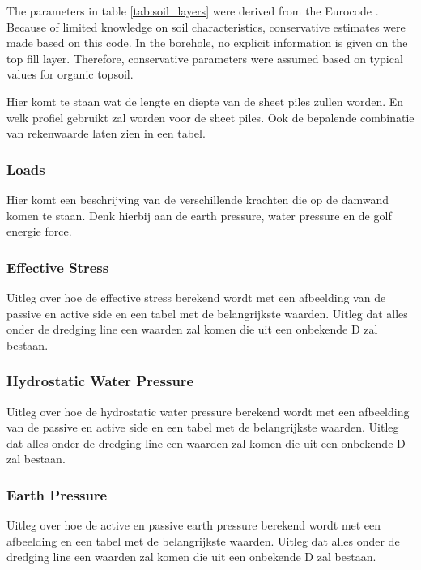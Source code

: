 The parameters in table \ref{tab:soil_layers} were derived from the Eurocode \autocite{stichtingkoninklijknederlandsnormalisatieinstituutNederlandseNormNEN2025}. Because of limited knowledge on soil characteristics, conservative estimates were made based on this code. In the borehole, no explicit information is given on the top fill layer. Therefore, conservative parameters were assumed based on typical values for organic topsoil.



Hier komt te staan wat de lengte en diepte van de sheet piles zullen worden. En welk profiel gebruikt zal worden voor de sheet piles. Ook de bepalende combinatie van rekenwaarde laten zien in een tabel.

\subsubsection{Loads}

Hier komt een beschrijving van de verschillende krachten die op de damwand komen te staan. Denk hierbij aan de earth pressure, water pressure en de golf energie force.

\subsubsection{Effective Stress}

Uitleg over hoe de effective stress berekend wordt met een afbeelding van de passive en active side en een tabel met de belangrijkste waarden. Uitleg dat alles onder de dredging line een waarden zal komen die uit een onbekende D zal bestaan.

\subsubsection{Hydrostatic Water Pressure}

Uitleg over hoe de hydrostatic water pressure berekend wordt met een afbeelding van de passive en active side en een tabel met de belangrijkste waarden. Uitleg dat alles onder de dredging line een waarden zal komen die uit een onbekende D zal bestaan.


\subsubsection{Earth Pressure}

Uitleg over hoe de active en passive earth pressure berekend wordt met een afbeelding en een tabel met de belangrijkste waarden. Uitleg dat alles onder de dredging line een waarden zal komen die uit een onbekende D zal bestaan. 

